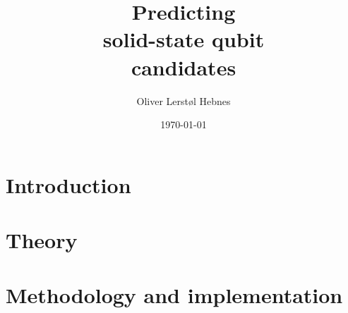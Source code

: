 \documentclass[twoside, english, notitlepage, 12pt]{uiofysmaster}
\author{Oliver Lerstøl Hebnes}
\title{Predicting\\
solid-state qubit\\
candidates
}
\date{\today}
\begin{document}
\hypersetup{pageanchor=false}
\frontmatter
    \maketitle

    \begin{abstract}
    
    \end{abstract}

    \begin{acknowledgements}
    
    \end{acknowledgements}

    \setcounter{tocdepth}{1}
    \tableofcontents
    \newpage

\mainmatter
    \part{Introduction}
      

    \part{Theory}
        
        
        

    \part{Methodology and implementation}
        

\end{document}
